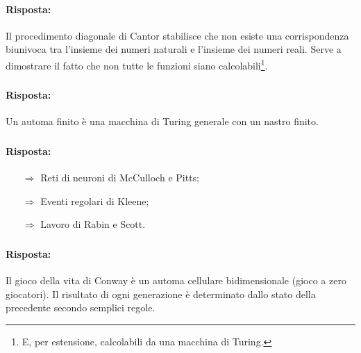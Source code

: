 
\paragraph{Risposta:} Il procedimento diagonale di Cantor stabilisce che non esiste una corrispondenza biunivoca tra
l'insieme dei numeri naturali e l'insieme dei numeri reali. Serve a dimostrare il fatto che non tutte le funzioni 
siano calcolabili\footnote{E, per estensione, calcolabili da una macchina di Turing.}.

\subsubsection{}


\paragraph{Risposta:} Un automa finito è una macchina di Turing generale con un nastro finito.

\subsubsection{}


\paragraph{Risposta:}

\begin{itemize}
    \item [$\Rightarrow$] Reti di neuroni di McCulloch e Pitts;
    \item [$\Rightarrow$] Eventi regolari di Kleene;
    \item [$\Rightarrow$] Lavoro di Rabin e Scott.
\end{itemize}

\subsubsection{}


\paragraph{Risposta:} Il gioco della vita di Conway è un automa cellulare bidimensionale (gioco a zero giocatori).
Il risultato di ogni generazione è determinato dallo stato della precedente secondo semplici regole.

